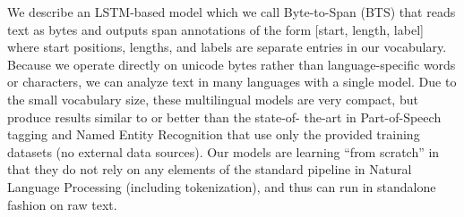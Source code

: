 We describe an LSTM-based model which we call Byte-to-Span (BTS) that reads text as bytes and outputs span annotations of the form [start, length, label] where start positions, lengths, and labels are separate entries in our vocabulary. Because we operate directly on unicode bytes rather than language-specific words or characters, we can analyze text in many languages with a single model. Due to the small vocabulary size, these multilingual models are very compact, but produce results similar to or better than the state-of- the-art in Part-of-Speech tagging and Named Entity Recognition that use only the provided training datasets (no external data sources). Our models are learning ``from scratch'' in that they do not rely on any elements of the standard pipeline in Natural Language Processing (including tokenization), and thus can run in standalone fashion on raw text.
